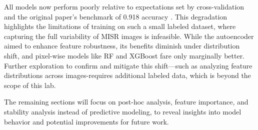 \documentclass[10pt,letterpaper]{article}
\begin{document}
All models now perform poorly relative to expectations set by cross-validation and the original paper's benchmark of 0.918 accuracy \cite{shi2008daytime}. This degradation highlights the limitations of training on such a small labeled dataset, where capturing the full variability of MISR images is infeasible. While the autoencoder aimed to enhance feature robustness, its benefits diminish under distribution shift, and pixel-wise models like RF and XGBoost fare only marginally better. Further exploration to confirm and mitigate this shift—such as analyzing feature distributions across images-requires additional labeled data, which is beyond the scope of this lab.

The remaining sections will focus on post-hoc analysis, feature importance, and stability analysis instead of predictive modeling, to reveal insights into model behavior and potential improvements for future work.






\end{document}
